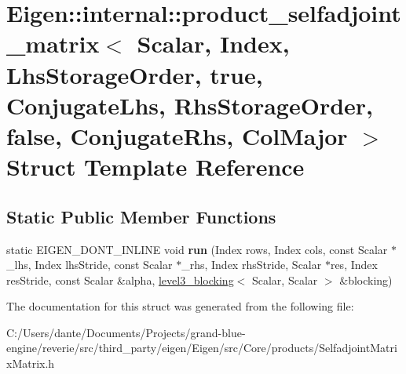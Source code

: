 \hypertarget{struct_eigen_1_1internal_1_1product__selfadjoint__matrix_3_01_scalar_00_01_index_00_01_lhs_storaad3bcb15c8c51e53cb4ff654ee80e230}{}\section{Eigen\+::internal\+::product\+\_\+selfadjoint\+\_\+matrix$<$ Scalar, Index, Lhs\+Storage\+Order, true, Conjugate\+Lhs, Rhs\+Storage\+Order, false, Conjugate\+Rhs, Col\+Major $>$ Struct Template Reference}
\label{struct_eigen_1_1internal_1_1product__selfadjoint__matrix_3_01_scalar_00_01_index_00_01_lhs_storaad3bcb15c8c51e53cb4ff654ee80e230}
\subsection*{Static Public Member Functions}
\begin{DoxyCompactItemize}
\item 
\mbox{\label{struct_eigen_1_1internal_1_1product__selfadjoint__matrix_3_01_scalar_00_01_index_00_01_lhs_storaad3bcb15c8c51e53cb4ff654ee80e230_a2a8c8f83ea879c56c882d30d3414cd40}} 
static E\+I\+G\+E\+N\+\_\+\+D\+O\+N\+T\+\_\+\+I\+N\+L\+I\+NE void {\bfseries run} (Index rows, Index cols, const Scalar $\ast$\+\_\+lhs, Index lhs\+Stride, const Scalar $\ast$\+\_\+rhs, Index rhs\+Stride, Scalar $\ast$res, Index res\+Stride, const Scalar \&alpha, \mbox{\hyperlink{class_eigen_1_1internal_1_1level3__blocking}{level3\+\_\+blocking}}$<$ Scalar, Scalar $>$ \&blocking)
\end{DoxyCompactItemize}


The documentation for this struct was generated from the following file\+:\begin{DoxyCompactItemize}
\item 
C\+:/\+Users/dante/\+Documents/\+Projects/grand-\/blue-\/engine/reverie/src/third\+\_\+party/eigen/\+Eigen/src/\+Core/products/Selfadjoint\+Matrix\+Matrix.\+h\end{DoxyCompactItemize}
